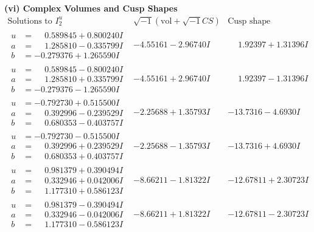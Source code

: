 \documentclass[1p]{elsarticle_modified}
\theoremstyle{definition}
\newcommand{\I}{\sqrt{-1}}
\begin{document}
\newpage\flushleft \textbf{(vi) Complex Volumes and Cusp Shapes}
$$\begin{array}{c|c|c}  
\text{Solutions to }I^u_{2}& \I (\text{vol} + \sqrt{-1}CS) & \text{Cusp shape}\\
 \hline 
\begin{aligned}
u &= \phantom{-}0.589845 + 0.800240 I \\
a &= \phantom{-}1.285810 - 0.335799 I \\
b &= -0.279376 + 1.265590 I\end{aligned}
 & -4.55161 - 2.96740 I & \phantom{-}1.92397 + 1.31396 I \\ \hline\begin{aligned}
u &= \phantom{-}0.589845 - 0.800240 I \\
a &= \phantom{-}1.285810 + 0.335799 I \\
b &= -0.279376 - 1.265590 I\end{aligned}
 & -4.55161 + 2.96740 I & \phantom{-}1.92397 - 1.31396 I \\ \hline\begin{aligned}
u &= -0.792730 + 0.515500 I \\
a &= \phantom{-}0.392996 - 0.239529 I \\
b &= \phantom{-}0.680353 - 0.403757 I\end{aligned}
 & -2.25688 + 1.35793 I & -13.7316 - 4.6930 I \\ \hline\begin{aligned}
u &= -0.792730 - 0.515500 I \\
a &= \phantom{-}0.392996 + 0.239529 I \\
b &= \phantom{-}0.680353 + 0.403757 I\end{aligned}
 & -2.25688 - 1.35793 I & -13.7316 + 4.6930 I \\ \hline\begin{aligned}
u &= \phantom{-}0.981379 + 0.390494 I \\
a &= \phantom{-}0.332946 + 0.042006 I \\
b &= \phantom{-}1.177310 + 0.586123 I\end{aligned}
 & -8.66211 - 1.81322 I & -12.67811 + 2.30723 I \\ \hline\begin{aligned}
u &= \phantom{-}0.981379 - 0.390494 I \\
a &= \phantom{-}0.332946 - 0.042006 I \\
b &= \phantom{-}1.177310 - 0.586123 I\end{aligned}
 & -8.66211 + 1.81322 I & -12.67811 - 2.30723 I \\ \hline\begin{aligned}

\end{aligned}
\end{array}$$
\end{document}
